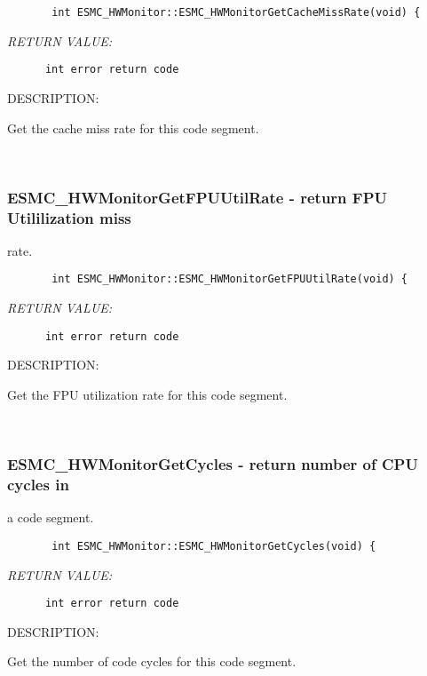 \begin{verbatim}       int ESMC_HWMonitor::ESMC_HWMonitorGetCacheMissRate(void) {\end{verbatim}{\em RETURN VALUE:}
\begin{verbatim}      int error return code\end{verbatim}
{\sf DESCRIPTION:\\ }


        Get the cache miss rate for this code segment.
   
 
\mbox{}\hrulefill\ 
 
\subsubsection{ESMC\_HWMonitorGetFPUUtilRate - return FPU Utililization miss}


   rate.
  
\begin{verbatim}       int ESMC_HWMonitor::ESMC_HWMonitorGetFPUUtilRate(void) {\end{verbatim}{\em RETURN VALUE:}
\begin{verbatim}      int error return code\end{verbatim}
{\sf DESCRIPTION:\\ }


        Get the FPU utilization rate for this code segment.
   
 
\mbox{}\hrulefill\ 
 
\subsubsection{ESMC\_HWMonitorGetCycles - return number of CPU cycles in}


   a code segment.
  
\begin{verbatim}       int ESMC_HWMonitor::ESMC_HWMonitorGetCycles(void) {\end{verbatim}{\em RETURN VALUE:}
\begin{verbatim}      int error return code\end{verbatim}
{\sf DESCRIPTION:\\ }


        Get the number of code cycles for this code segment.
   
